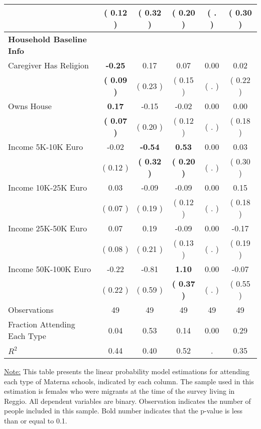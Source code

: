 \begin{table}[H]
{\begin{tabular}{lccccc}
\quad  & (     0.12 ) & (     0.32 )  & (     0.20 )  & (        . ) & (     0.30 ) \\
\midrule
\textbf{Household Baseline Info} \\
\quad Caregiver Has Religion & \textbf{    -0.25} &      0.17 &      0.07 &      0.00 &      0.02 \\
\quad  & \textbf{(     0.09 )} & (     0.23 )  & (     0.15 )  & (        . ) & (     0.22 ) \\
\quad Owns House & \textbf{     0.17} &     -0.15 &     -0.02 &      0.00 &      0.00 \\
\quad  & \textbf{(     0.07 )} & (     0.20 )  & (     0.12 )  & (        . ) & (     0.18 ) \\
\quad Income 5K-10K Euro &     -0.02 & \textbf{    -0.54} & \textbf{     0.53} &      0.00 &      0.03 \\
\quad  & (     0.12 ) & \textbf{(     0.32 )}  & \textbf{(     0.20 )}  & (        . ) & (     0.30 ) \\
\quad Income 10K-25K Euro &      0.03 &     -0.09 &     -0.09 &      0.00 &      0.15 \\
\quad  & (     0.07 ) & (     0.19 )  & (     0.12 )  & (        . ) & (     0.18 ) \\
\quad Income 25K-50K Euro &      0.07 &      0.19 &     -0.09 &      0.00 &     -0.17 \\
\quad  & (     0.08 ) & (     0.21 )  & (     0.13 )  & (        . ) & (     0.19 ) \\
\quad Income 50K-100K Euro &     -0.22 &     -0.81 & \textbf{     1.10} &      0.00 &     -0.07 \\
\quad  & (     0.22 ) & (     0.59 )  & \textbf{(     0.37 )}  & (        . ) & (     0.55 ) \\
\midrule
Observations & 49 & 49 & 49 & 49 & 49 \\
Fraction Attending Each Type &      0.04 &      0.53 &      0.14 &      0.00 &      0.29 \\
\midrule
$ R^2$ &      0.44 &      0.40 &      0.52 &         . &      0.35 \\
\bottomrule
\end{tabular}}
\end{table}
\begin{footnotesize}
\noindent\underline{Note:} This table presents the linear probability model estimations for attending each type of Materna schools, indicated by each column. The sample used in this estimation is females who were migrants at the time of the survey living in Reggio. All dependent variables are binary. Observation indicates the number of people included in this sample. Bold number indicates that the p-value is less than or equal to 0.1.
\end{footnotesize}
